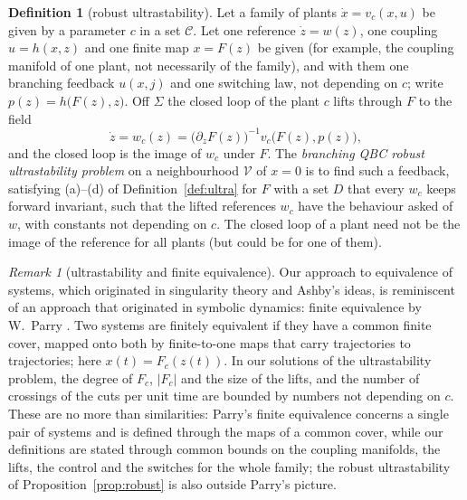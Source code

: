 \documentclass[11pt,reqno]{amsart}
\theoremstyle{plain}
\theoremstyle{definition}
\newtheorem*{definition}{Definition}
\theoremstyle{remark}
\newtheorem*{remark}{Remark}
\newcommand{\Sig}{\Sigma}
\begin{document}
\begin{definition}[robust ultrastability]\label{def:robust}
Let a family of plants $\dot x=v_c(x,u)$ be given by a parameter $c$ in a set $\mathcal C$. Let one reference $\dot z=w(z)$, one coupling $u=h(x,z)$ and one finite map $x=F(z)$ be given (for example, the coupling manifold of one plant, not necessarily of the family), and with them one branching feedback $u(x,j)$ and one switching law, not depending on $c$; write $p(z)=h\bigl(F(z),z\bigr)$. Off $\Sig$ the closed loop of the plant $c$ lifts through $F$ to the field
\[
  \dot z=w_c(z)=\bigl(\partial_zF(z)\bigr)^{-1}v_c\bigl(F(z),p(z)\bigr),
\]
and the closed loop is the image of $w_c$ under $F$. The \emph{branching QBC robust ultrastability problem} on a neighbourhood $\mathcal V$ of $x=0$ is to find such a feedback, satisfying (a)--(d) of Definition~\ref{def:ultra} for $F$ with a set $D$ that every $w_c$ keeps forward invariant, such that the lifted references $w_c$ have the behaviour asked of $w$, with constants not depending on $c$. The closed loop of a plant need not be the image of the reference for all plants (but could be for one of them).
\end{definition}

\begin{remark}[ultrastability and finite equivalence]
Our approach to equivalence of systems, which originated in singularity theory and Ashby's ideas, is reminiscent of an approach that originated in symbolic dynamics: finite equivalence by W.~Parry \cite{Parry1977}. Two systems are finitely equivalent if they have a common finite cover, mapped onto both by finite-to-one maps that carry trajectories to trajectories; here $x(t)=F_c(z(t))$. In our solutions of the ultrastability problem, the degree of $F_c$, $|F_c|$ and the size of the lifts, and the number of crossings of the cuts per unit time are bounded by numbers not depending on $c$. These are no more than similarities: Parry's finite equivalence concerns a single pair of systems and is defined through the maps of a common cover, while our definitions are stated through common bounds on the coupling manifolds, the lifts, the control and the switches for the whole family; the robust ultrastability of Proposition~\ref{prop:robust} is also outside Parry's picture.
\end{remark}
\end{document}
